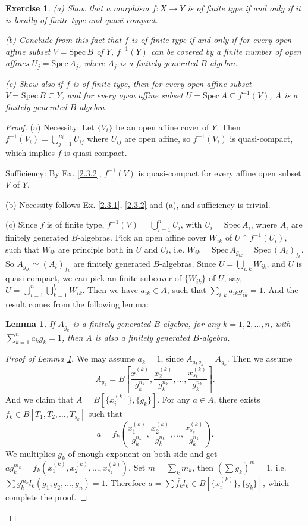 \documentclass{amsart}
\newtheorem{lm}[theorem]{Lemma}
\newtheorem{exe}{Exercise}[subsection]
\theoremstyle{remark}\newtheorem{rmk}[theorem]{Remark}
\begin{document}
\begin{exe}
(a) Show that a morphism $f:X\rightarrow Y$ is of finite type if and only if it is locally of finite type and quasi-compact.

(b) Conclude from this fact that $f$ is of finite type if and only if for every open affine subset $V=\mathrm{Spec}\,B$ of $Y$, $f^{-1}(Y)$ can be covered
by a finite number of open affines $U_j=\mathrm{Spec}\,A_j$, where $A_j$ is a finitely generated $B$-algebra.

(c) Show also if $f$ is of finite type, then for every open affine subset $V=\mathrm{Spec}\,B\subseteq Y$, and for every open affine
subset $U=\mathrm{Spec}\,A\subseteq f^{-1}(V)$, A is a finitely generated $B$-algebra.
\end{exe}
\begin{proof}
(a) Necessity: Let $\{V_i\}$ be an open affine cover of $Y$. Then $f^{-1}(V_i)=\bigcup_{j=1}^{n_i}U_{ij}$ where $U_{ij}$ are open affine, so $f^{-1}(V_i)$ is quasi-compact, which implies $f$ is quasi-compact.

Sufficiency: By Ex. \ref{2.3.2}, $f^{-1}(V)$ is quasi-compact for every affine open subset $V$ of $Y$.

(b) Necessity follows Ex. \ref{2.3.1}, \ref{2.3.2} and (a), and sufficiency is trivial.

(c) Since $f$ is of finite type, $f^{-1}(V)=\bigcup_{i=1}^nU_i$, with $U_i=\mathrm{Spec}\,A_i$, where $A_i$ are finitely generated $B$-algebras. Pick an open affine cover $W_{ik}$ of $U\cap f^{-1}(U_i)$, such that 
$W_{ik}$ are principle both in $U$ and $U_i$, i.e. $W_{ik}=\mathrm{Spec}\,A_{g_{ik}}=\mathrm{Spec}\,(A_{i})_{f_{k}}$. So $A_{g_{ik}}\simeq (A_{i})_{f_k}$ are finitely generated $B$-algebras. Since $U=\bigcup_{i,k} W_{ik}$, and
$U$ is quasi-compact, we can pick an finite subcover of $\{W_{ik}\}$ of $U$, say, $U=\bigcup_{i=1}^n\bigcup_{k=1}^{l_i}W_{ik}$. Then we have $a_{ik}\in A$, such that $\sum_{i,k} a_{ik}g_{ik}=1$.
And the result comes from the following lemma:
\begin{lm}
	\label{l3}
	If $A_{g_k}$ is a finitely generated $B$-algebra, for any $k=1,2,\dots,n$, with $\sum_{k=1}^n a_kg_k=1$, then A is also a finitely generated $B$-algebra.
\end{lm}
\begin{proof}[Proof of Lemma \ref*{l3}]
	We may assume $a_k=1$, since $A_{a_kg_k}=A_{g_k}$. Then we assume $$A_{g_k}=B\left[\frac{x_1^{(k)}}{g_k^{n_k}},\frac{x_2^{(k)}}{g_k^{n_k}},\dots,\frac{x_{s_k}^{(k)}}{g_k^{n_k}}\right].$$
	And we claim that $A=B[\{x_i^{(k)}\},\{g_k\}]$. For any $a\in A$, there exists $f_k\in B[T_1,T_2,\dots,T_{s_k}]$ such that $$a=f_k\left(\frac{x_1^{(k)}}{g_k^{n_k}},\frac{x_2^{(k)}}{g_k^{n_k}},\dots,\frac{x_{s_k}^{(k)}}{g_k^{n_k}}\right).$$
	We multiplies $g_k$ of enough exponent on both side and get $ag_k^{m_k}=\bar {f}_k(x_1^{(k)},x_2^{(k)},\dots,x_{s_k}^{(k)})$. Set $m=\sum_k m_k$, then $ (\sum g_k)^m=1$, i.e. $\sum g_k^{m_k}l_k(g_1,g_2,\dots,g_n)=1$.
	Therefore $a=\sum \bar{f_k}l_k\in B[\{x_i^{(k)}\},\{g_k\}]$, which complete the proof.
\end{proof}
\end{proof}
\end{document}
